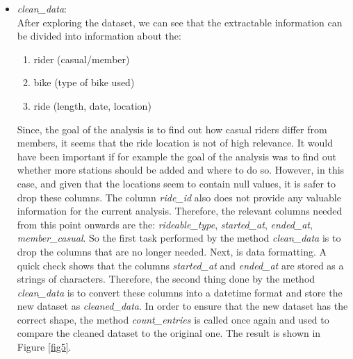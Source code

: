 \documentclass[12pt]{article}
\begin{document}
\begin{itemize}
	\item \textit{clean\_data}:\\
	After exploring the dataset, we can see that the extractable information can be divided into information about the:
	\begin{enumerate} 
	\item rider (casual/member)
	\item bike (type of bike used)
	\item ride (length, date, location)
	\end{enumerate}
Since, the goal of the analysis is to find out how casual riders differ from members, it seems that the ride location is not of high relevance. It would have been important if for example the goal of the analysis was to find out whether more stations should be added and where to do so. However, in this case, and given that the locations seem to contain null values, it is safer to drop these columns. The column \textit{ride\_id} also does not provide any valuable information for the current analysis. Therefore, the relevant columns needed from this point onwards are the: \textit{rideable\_type}, \textit{started\_at}, \textit{ended\_at}, \textit{member\_casual}. So the first task performed by the method \textit{clean\_data} is to drop the columns that are no longer needed. Next, is data formatting. A quick check shows that the columns \textit{started\_at} and \textit{ended\_at} are stored as a strings of characters. Therefore, the second thing done by the method \textit{clean\_data} is to convert these columns into a datetime format and store the new dataset as \textit{cleaned\_data}. In order to ensure that the new dataset has the correct shape, the method \textit{count\_entries} is called once again and used to compare the cleaned dataset to the original one. The result is shown in Figure \ref{fig5}.
	

\end{itemize}
\end{document}
